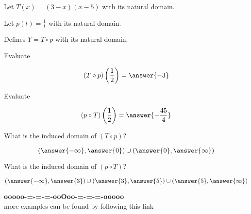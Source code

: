 \documentclass{ximera}
\begin{document}
\begin{example}



Let $T(x) = (3-x)(x-5)$ with its natural domain.


Let $p(t) = \frac{1}{t}$ with its natural domain.


Defines $Y = T \circ p$ with its natural domain.



\begin{question}

Evaluate


\[
(T \circ p)\left( \frac{1}{2} \right) = \answer{-3}
\]



\end{question}






\begin{question}

Evaluate


\[
(p \circ T)\left( \frac{1}{2} \right) = \answer{-\frac{45}{4}}
\]



\end{question}





\begin{question}

What is the induced domain of $(T \circ p)$?


\[
\left( \answer{-\infty}, \answer{0}  \right) \cup \left( \answer{0}, \answer{\infty}  \right)
\]



\end{question}








\begin{question}

What is the induced domain of $(p \circ T)$?


\[
\left( \answer{-\infty}, \answer{3}  \right) \cup \left( \answer{3}, \answer{5}  \right)  \cup \left( \answer{5}, \answer{\infty}  \right)
\]



\end{question}







\end{example}














\begin{center}
\textbf{\textcolor{green!50!black}{ooooo-=-=-=-ooOoo-=-=-=-ooooo}} \\

more examples can be found by following this link\\ 

\end{center}
\end{document}

